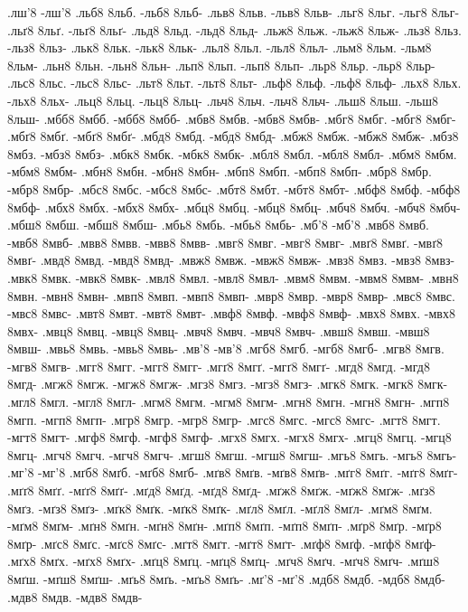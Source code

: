 {%
.лш'8 -лш'8
.льб8 8льб. -льб8 8льб-
.льв8 8льв. -льв8 8льв-
.льг8 8льг. -льг8 8льг-
.льґ8 8льґ. -льґ8 8льґ-
.льд8 8льд. -льд8 8льд-
.льж8 8льж. -льж8 8льж-
.льз8 8льз. -льз8 8льз-
.льк8 8льк. -льк8 8льк-
.льл8 8льл. -льл8 8льл-
.льм8 8льм. -льм8 8льм-
.льн8 8льн. -льн8 8льн-
.льп8 8льп. -льп8 8льп-
.льр8 8льр. -льр8 8льр-
.льс8 8льс. -льс8 8льс-
.льт8 8льт. -льт8 8льт-
.льф8 8льф. -льф8 8льф-
.льх8 8льх. -льх8 8льх-
.льц8 8льц. -льц8 8льц-
.льч8 8льч. -льч8 8льч-
.льш8 8льш. -льш8 8льш-
.мбб8 8мбб. -мбб8 8мбб-
.мбв8 8мбв. -мбв8 8мбв-
.мбг8 8мбг. -мбг8 8мбг-
.мбґ8 8мбґ. -мбґ8 8мбґ-
.мбд8 8мбд. -мбд8 8мбд-
.мбж8 8мбж. -мбж8 8мбж-
.мбз8 8мбз. -мбз8 8мбз-
.мбк8 8мбк. -мбк8 8мбк-
.мбл8 8мбл. -мбл8 8мбл-
.мбм8 8мбм. -мбм8 8мбм-
.мбн8 8мбн. -мбн8 8мбн-
.мбп8 8мбп. -мбп8 8мбп-
.мбр8 8мбр. -мбр8 8мбр-
.мбс8 8мбс. -мбс8 8мбс-
.мбт8 8мбт. -мбт8 8мбт-
.мбф8 8мбф. -мбф8 8мбф-
.мбх8 8мбх. -мбх8 8мбх-
.мбц8 8мбц. -мбц8 8мбц-
.мбч8 8мбч. -мбч8 8мбч-
.мбш8 8мбш. -мбш8 8мбш-
.мбь8 8мбь. -мбь8 8мбь-
.мб'8 -мб'8
.мвб8 8мвб. -мвб8 8мвб-
.мвв8 8мвв. -мвв8 8мвв-
.мвг8 8мвг. -мвг8 8мвг-
.мвґ8 8мвґ. -мвґ8 8мвґ-
.мвд8 8мвд. -мвд8 8мвд-
.мвж8 8мвж. -мвж8 8мвж-
.мвз8 8мвз. -мвз8 8мвз-
.мвк8 8мвк. -мвк8 8мвк-
.мвл8 8мвл. -мвл8 8мвл-
.мвм8 8мвм. -мвм8 8мвм-
.мвн8 8мвн. -мвн8 8мвн-
.мвп8 8мвп. -мвп8 8мвп-
.мвр8 8мвр. -мвр8 8мвр-
.мвс8 8мвс. -мвс8 8мвс-
.мвт8 8мвт. -мвт8 8мвт-
.мвф8 8мвф. -мвф8 8мвф-
.мвх8 8мвх. -мвх8 8мвх-
.мвц8 8мвц. -мвц8 8мвц-
.мвч8 8мвч. -мвч8 8мвч-
.мвш8 8мвш. -мвш8 8мвш-
.мвь8 8мвь. -мвь8 8мвь-
.мв'8 -мв'8
.мгб8 8мгб. -мгб8 8мгб-
.мгв8 8мгв. -мгв8 8мгв-
.мгг8 8мгг. -мгг8 8мгг-
.мгґ8 8мгґ. -мгґ8 8мгґ-
.мгд8 8мгд. -мгд8 8мгд-
.мгж8 8мгж. -мгж8 8мгж-
.мгз8 8мгз. -мгз8 8мгз-
.мгк8 8мгк. -мгк8 8мгк-
.мгл8 8мгл. -мгл8 8мгл-
.мгм8 8мгм. -мгм8 8мгм-
.мгн8 8мгн. -мгн8 8мгн-
.мгп8 8мгп. -мгп8 8мгп-
.мгр8 8мгр. -мгр8 8мгр-
.мгс8 8мгс. -мгс8 8мгс-
.мгт8 8мгт. -мгт8 8мгт-
.мгф8 8мгф. -мгф8 8мгф-
.мгх8 8мгх. -мгх8 8мгх-
.мгц8 8мгц. -мгц8 8мгц-
.мгч8 8мгч. -мгч8 8мгч-
.мгш8 8мгш. -мгш8 8мгш-
.мгь8 8мгь. -мгь8 8мгь-
.мг'8 -мг'8
.мґб8 8мґб. -мґб8 8мґб-
.мґв8 8мґв. -мґв8 8мґв-
.мґг8 8мґг. -мґг8 8мґг-
.мґґ8 8мґґ. -мґґ8 8мґґ-
.мґд8 8мґд. -мґд8 8мґд-
.мґж8 8мґж. -мґж8 8мґж-
.мґз8 8мґз. -мґз8 8мґз-
.мґк8 8мґк. -мґк8 8мґк-
.мґл8 8мґл. -мґл8 8мґл-
.мґм8 8мґм. -мґм8 8мґм-
.мґн8 8мґн. -мґн8 8мґн-
.мґп8 8мґп. -мґп8 8мґп-
.мґр8 8мґр. -мґр8 8мґр-
.мґс8 8мґс. -мґс8 8мґс-
.мґт8 8мґт. -мґт8 8мґт-
.мґф8 8мґф. -мґф8 8мґф-
.мґх8 8мґх. -мґх8 8мґх-
.мґц8 8мґц. -мґц8 8мґц-
.мґч8 8мґч. -мґч8 8мґч-
.мґш8 8мґш. -мґш8 8мґш-
.мґь8 8мґь. -мґь8 8мґь-
.мґ'8 -мґ'8
.мдб8 8мдб. -мдб8 8мдб-
.мдв8 8мдв. -мдв8 8мдв-
}
